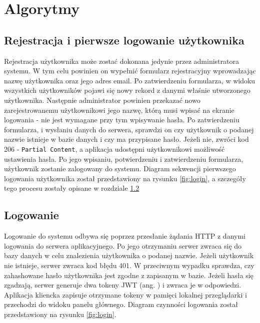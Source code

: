 \section{Algorytmy}

\subsection{Rejestracja i pierwsze logowanie użytkownika}

Rejestracja użytkownika może zostać dokonana jedynie przez administratora systemu. W tym celu powinien on wypełnić formularz rejestracyjny wprowadzając nazwę użytkownika oraz jego adres email. Po zatwierdzeniu formularza, w widoku wszystkich użytkowników pojawi się nowy rekord z danymi właśnie utworzonego użytkownika. Następnie administrator powinien przekazać nowo zarejestrowanemu użytkownikowi jego nazwę, którą musi wpisać na ekranie logowania - nie jest wymagane przy tym wpisywanie hasła. Po zatwierdzeniu formularza, i wysłaniu danych do serwera, sprawdzi on czy użytkownik o podanej nazwie istnieje w bazie danych i czy ma przypisane hasło. Jeżeli nie, zwróci kod 206 - \texttt{Partial Content}, a aplikacja udostępni użytkownikowi możliwość ustawienia hasła. Po jego wpisaniu, potwierdzeniu i zatwierdzeniu formularza, użytkownik zostanie zalogowany do systemu. Diagram sekwencji pierwszego logowania użytkownika został przedstawiony na rysunku \ref{fig:login}, a szczegóły tego procesu zostały opisane w rozdziale \ref{ss:logowanie}

\subsection{Logowanie}
\label{ss:logowanie}

Logowanie do systemu odbywa się poprzez przesłanie żądania HTTP z danymi logowania do serwera aplikacyjnego. Po jego otrzymaniu serwer zwraca się do bazy danych w celu znalezienia użytkownika o podanej nazwie. Jeżeli użytkownik nie istnieje, serwer zwraca kod błędu 401. W przeciwnym wypadku sprawdza, czy zahashowane hasło użytkownika jest zgodne z zapisanym w bazie. Jeżeli hasła się zgadzają, serwer generuje dwa tokeny JWT (ang. ) i zwraca je w odpowiedzi. Aplikacja kliencka zapisuje otrzymane tokeny w pamięci lokalnej przeglądarki i przechodzi do widoku panelu głównego. Diagram czynności logowania został przedstawiony na rysunku \ref{fig:login}.

